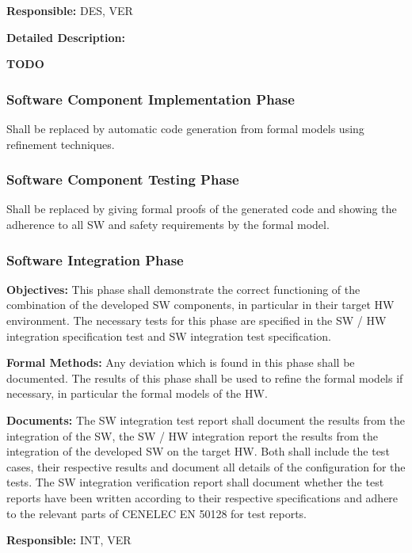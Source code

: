 {\bf Responsible:} DES, VER

{\bf Detailed Description:}

{\Huge \bf TODO}

\subsubsection{Software Component Implementation Phase}
\label{sec:softw-comp-impl}

Shall be replaced by automatic code generation from formal models using
refinement techniques.

\subsubsection{Software Component Testing Phase}
\label{sec:softw-comp-test}

Shall be replaced by giving formal proofs of the generated code and showing the
adherence to all SW and safety requirements by the formal model.

\subsubsection{Software Integration Phase}
\label{sec:softw-integr-phase}

{\bf Objectives:} This phase shall demonstrate the correct functioning of the
combination of the developed SW components, in particular in their target HW
environment. The necessary tests for this phase are specified in the SW / HW
integration specification test and SW integration test specification.

{\bf Formal Methods:} Any deviation which is found in this phase shall be
documented. The results of this phase shall be used to refine the formal models
if necessary, in particular the formal models of the HW.

{\bf Documents:} The SW integration test report shall document the results from
the integration of the SW, the SW / HW integration report the results from the
integration of the developed SW on the target HW. Both shall include the test
cases, their respective results and document all details of the configuration
for the tests. The SW integration verification report shall document whether the
test reports have been written according to their respective specifications and
adhere to the relevant parts of CENELEC EN 50128 for test reports.

{\bf Responsible:} INT, VER

